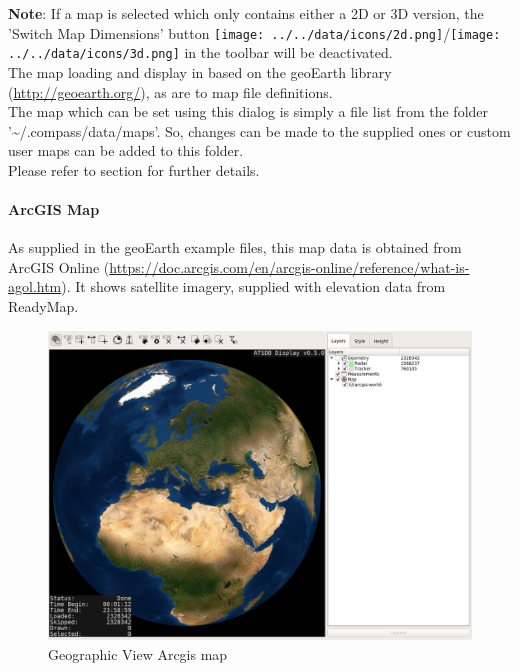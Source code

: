  \textbf{Note}: If a map is selected which only contains either a 2D or 3D version, 
 the 'Switch Map Dimensions' button \texttt{[image: ../../data/icons/2d.png]}/\texttt{[image: ../../data/icons/3d.png]} in the toolbar will be deactivated.\\
 
The map loading and display in based on the geoEarth library (\url{http://geoearth.org/}), as are to map file definitions.  \\

The map which can be set using this dialog is simply a file list from the folder '\textasciitilde/.compass/data/maps'. So, changes can be made to the supplied ones or custom user maps can be added to this folder. \\
Please refer to section  for further details.

\newpage
\paragraph{ArcGIS Map}

As supplied in the geoEarth example files, this map data is obtained from ArcGIS Online (\url{https://doc.arcgis.com/en/arcgis-online/reference/what-is-agol.htm}). It shows satellite imagery, supplied with elevation data from ReadyMap. 

\begin{figure}[H]
    \hspace*{-2.5cm}
    \includegraphics[width=19cm,frame]{figures/geoview_arcgis.png}
  \caption{Geographic View Arcgis map}
\end{figure}

